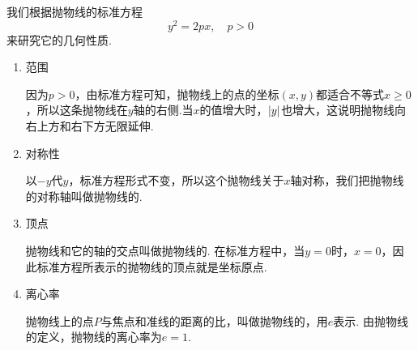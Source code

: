 我们根据抛物线的标准方程\[
y^2 = 2px, \quad p > 0
\]来研究它的几何性质.
\begin{enumerate}
\item 范围

因为\(p>0\)，由标准方程可知，抛物线上的点的坐标\((x,y)\)都适合不等式\(x \geqslant 0\)，所以这条抛物线在\(y\)轴的右侧.当\(x\)的值增大时，\(\abs{y}\)也增大，这说明抛物线向右上方和右下方无限延伸.

\item 对称性

以\(-y\)代\(y\)，标准方程形式不变，所以这个抛物线关于\(x\)轴对称，我们把抛物线的对称轴叫做抛物线的.

\item 顶点

抛物线和它的轴的交点叫做抛物线的.
在标准方程中，当\(y=0\)时，\(x=0\)，因此标准方程所表示的抛物线的顶点就是坐标原点.

\item 离心率

抛物线上的点\(P\)与焦点和准线的距离的比，叫做抛物线的，用\(e\)表示.
由抛物线的定义，抛物线的离心率为\(e = 1\).
\end{enumerate}

